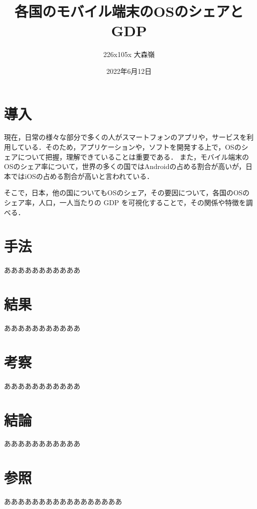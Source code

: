 \documentclass[12pt, a4paper]{jarticle}
\title{各国のモバイル端末のOSのシェアとGDP}
\author{226x105x 大森嶺}
\date{2022年6月12日}
\begin{document}
\maketitle

\section{導入}
現在，日常の様々な部分で多くの人がスマートフォンのアプリや，サービスを利用している．そのため，アプリケーションや，ソフトを開発する上で，OSのシェアについて把握，理解できていることは重要である．
また，モバイル端末のOSのシェア率について，世界の多くの国ではAndroidの占める割合が高いが，日本ではiOSの占める割合が高いと言われている．

そこで，日本，他の国についてもOSのシェア，その要因について，各国のOSのシェア率，人口，一人当たりの GDP を可視化することで，その関係や特徴を調べる．

\section{手法}
あああああああああああ

\section{結果}
あああああああああああ

\section{考察}
あああああああああああ

\section{結論}
あああああああああああ

\section{参照}
あああああああああああああああああ
\end{document}
